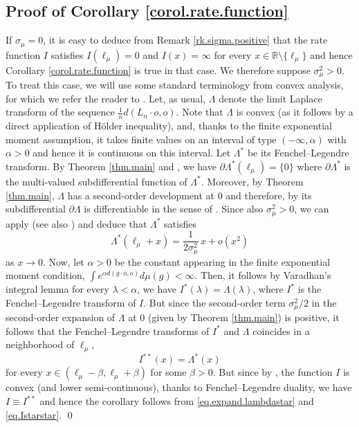 \documentclass[10pt]{amsart}
\theoremstyle{plain}
\theoremstyle{definition}
\newcommand\R{\mathbb{R}}
\begin{document}
\subsection{Proof of Corollary \ref{corol.rate.function}}\label{subsec.corol}
If $\sigma_\mu=0$, it is easy to deduce from Remark \ref{rk.sigma.positive} that the rate function $I$ satisfies $I(\ell_\mu)=0$ and $I(x)=\infty$ for every $x \in \R \setminus \{\ell_\mu\}$ and hence Corollary \ref{corol.rate.function} is true in that case. We therefore suppose $\sigma^2_\mu>0$. To treat this case, we will use some standard terminology from convex analysis, for which we refer the reader to \cite{convexity.book}. Let, as usual, $\Lambda$ denote the limit Laplace transform of the sequence $\frac{1}{n} d(L_n \cdot o,o)$. Note that $\Lambda$ is convex (as it follows by a direct application of Hölder inequality), and, thanks to the finite exponential moment assumption, it takes finite values on an interval of type $(-\infty,\alpha)$ with $\alpha>0$ and hence it is continuous on this interval. Let $\Lambda^\ast$ be its Fenchel--Legendre transform. By Theorem \ref{thm.main} and \cite[Prop.\,6.1.2]{convexity.book}, we have $\partial \Lambda^\ast(\ell_\mu)=\{0\}$ where $\partial \Lambda^\ast$ is the multi-valued subdifferential function of $\Lambda^{\ast}$. Moreover, by Theorem \ref{thm.main}, $\Lambda$ has a second-order development at $0$ and therefore, by \cite[Th.\,5.1.2]{convexity.book} its subdifferential $\partial \Lambda$ is differentiable in the sense of \cite[Def.\,5.1.1]{convexity.book}. Since also $\sigma_\mu^2>0$, we can apply \cite[Prop.\,6.2.5]{convexity.book} (see also \cite[Prop.\,4.5]{gianluca}) and deduce that $\Lambda^\ast$ satisfies
\begin{equation}\label{eq.expand.lambdastar}
\Lambda^{\ast}(\ell_\mu+ x)=\frac{1}{2\sigma_\mu^2}\,x + o(x^2)
\end{equation}
as $x \to 0$.
Now, let $\alpha>0$ be the constant appearing in the finite exponential moment condition, \ie $\int e^{\alpha d(g \cdot o,o)} d\mu(g)<\infty$.
Then, it follows by Varadhan's integral lemma \cite[Th.\,4.3.1]{dembo-zeitouni} for every $\lambda<\alpha$, we have $I^\ast(\lambda)=\Lambda(\lambda)$, where $I^\ast$ is the Fenchel--Legendre transform of $I$. But since the second-order term $\sigma^2_\mu/2$ in the second-order expansion of $\Lambda$ at $0$ (given by Theorem \ref{thm.main}) is positive, it follows that the Fenchel--Legendre transforms of $I^\ast$ and $\Lambda$ coincides in a neighborhood of $\ell_\mu$, \ie
\begin{equation}\label{eq.Istarstar}
I^{\ast \ast}(x)=\Lambda^{\ast}(x)
\end{equation}
for every $x \in (\ell_\mu-\beta,\ell_\mu+\beta)$ for some $\beta>0$. But since by \cite[Th.\,1.1]{BMSS}, the function $I$ is convex (and lower semi-continuous), thanks to Fenchel--Legendre duality, we have $I \equiv I^{\ast \ast}$ and hence the corollary follows from \eqref{eq.expand.lambdastar} and \eqref{eq.Istarstar}. \qed
\end{document}
